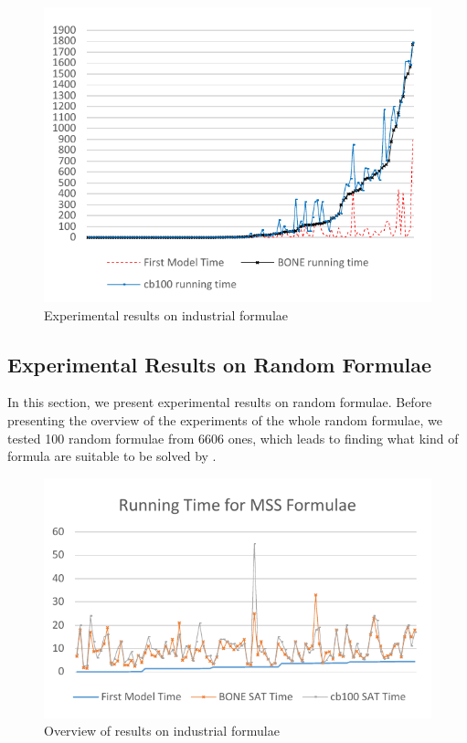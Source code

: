 \begin{figure}
    \centering
    \includegraphics[scale=0.8]{ind2.pdf}
   \caption{Experimental results on industrial formulae}
   \label{fig:ind-time}
\end{figure}

\subsection{Experimental Results on Random Formulae}
In this section, we present experimental results on random formulae. Before presenting the overview of the experiments of the whole random formulae, we tested 100 random formulae from 6606 ones, which leads to finding what kind of formula are suitable to be solved by \tool.

\begin{figure}
    \centering
    \includegraphics[scale=0.8]{mcs.pdf}
   \caption{Overview of results on industrial formulae}
   \label{fig:mcs-time}
\end{figure}

